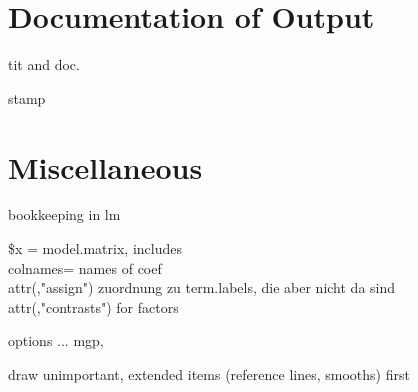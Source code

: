 \documentclass[11pt]{article}
\begin{document}
\section{Documentation of Output}
tit and doc.

stamp

\section{Miscellaneous}
\Itm
bookkeeping in lm

\$x = model.matrix, includes\\
  colnames= names of coef\\
  attr(,"assign") zuordnung zu term.labels, die aber nicht da sind\\
  attr(,"contrasts") for factors

\Itm
options ... mgp, 

\Itm
draw unimportant, extended items (reference lines, smooths) first
\end{document}
